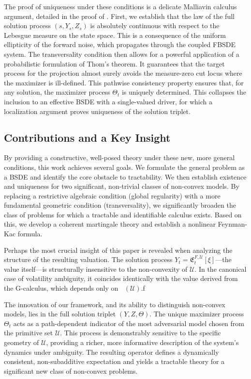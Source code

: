 \documentclass[12pt, letterpaper]{amsart}
\newcommand{\Efrak}{\mathfrak{E}}
\newcommand{\Efrakgen}{\Efrak^{F, \Ucal}}
\newcommand{\Ucal}{\mathcal{U}}
\DeclareMathOperator*{\overlineconv}{\overline{conv}}
\theoremstyle{plain}
\theoremstyle{definition}
\theoremstyle{remark}
\numberwithin{equation}{section} %
\begin{document}
The proof of uniqueness under these conditions is a delicate Malliavin calculus argument, detailed in the proof of . First, we establish that the law of the full solution process $(s, Y_s, Z_s)$ is absolutely continuous with respect to the Lebesgue measure on the state space. This is a consequence of the uniform ellipticity of the forward noise, which propagates through the coupled FBSDE system. The transversality condition then allows for a powerful application of a probabilistic formulation of Thom's theorem. It guarantees that the target process for the projection almost surely avoids the measure-zero cut locus where the maximizer is ill-defined. This pathwise consistency property ensures that, for any solution, the maximizer process $\Theta_t$ is uniquely determined. This collapses the inclusion to an effective BSDE with a single-valued driver, for which a localization argument proves uniqueness of the solution triplet.

\subsection{Contributions and a Key Insight}
By providing a constructive, well-posed theory under these new, more general conditions, this work achieves several goals. We formulate the general problem as a BSDE and identify the core obstacle to tractability. We then establish existence and uniqueness for two significant, non-trivial classes of non-convex models. By replacing a restrictive algebraic condition (global regularity) with a more fundamental geometric condition (transversality), we significantly broaden the class of problems for which a tractable and identifiable calculus exists. Based on this, we develop a coherent martingale theory and establish a nonlinear Feynman-Kac formula.

Perhaps the most crucial insight of this paper is revealed when analyzing the structure of the resulting valuation. The solution process $Y_t = \Efrakgen_t[\xi]$—the value itself—is structurally insensitive to the non-convexity of $\Ucal$. In the canonical case of volatility ambiguity, it coincides identically with the value derived from the G-calculus, which depends only on $\overlineconv(\Ucal)$.f

The innovation of our framework, and its ability to distinguish non-convex models, lies in the full solution triplet $(Y, Z, \Theta)$. The unique maximizer process $\Theta_t$ acts as a path-dependent indicator of the most adversarial model chosen from the primitive set $\Ucal$. This process is demonstrably sensitive to the specific geometry of $\Ucal$, providing a richer, more informative description of the system's dynamics under ambiguity. The resulting operator defines a dynamically consistent, non-subadditive expectation and yields a tractable theory for a significant new class of non-convex problems.
\end{document}
